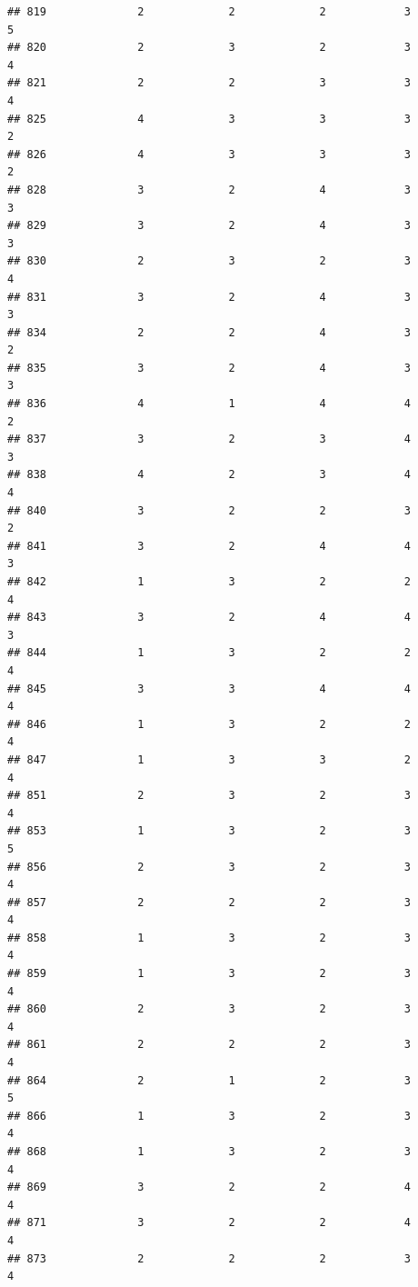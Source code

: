 \documentclass[
]{article}
\begin{document}
\begin{verbatim}
## 819              2             2             2            3          5
## 820              2             3             2            3          4
## 821              2             2             3            3          4
## 825              4             3             3            3          2
## 826              4             3             3            3          2
## 828              3             2             4            3          3
## 829              3             2             4            3          3
## 830              2             3             2            3          4
## 831              3             2             4            3          3
## 834              2             2             4            3          2
## 835              3             2             4            3          3
## 836              4             1             4            4          2
## 837              3             2             3            4          3
## 838              4             2             3            4          4
## 840              3             2             2            3          2
## 841              3             2             4            4          3
## 842              1             3             2            2          4
## 843              3             2             4            4          3
## 844              1             3             2            2          4
## 845              3             3             4            4          4
## 846              1             3             2            2          4
## 847              1             3             3            2          4
## 851              2             3             2            3          4
## 853              1             3             2            3          5
## 856              2             3             2            3          4
## 857              2             2             2            3          4
## 858              1             3             2            3          4
## 859              1             3             2            3          4
## 860              2             3             2            3          4
## 861              2             2             2            3          4
## 864              2             1             2            3          5
## 866              1             3             2            3          4
## 868              1             3             2            3          4
## 869              3             2             2            4          4
## 871              3             2             2            4          4
## 873              2             2             2            3          4

\end{verbatim}
\end{document}
